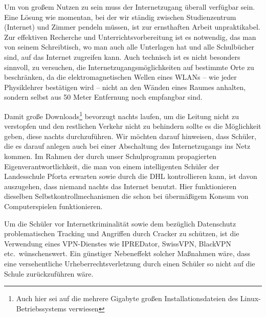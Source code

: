 \documentclass[10pt,a4paper,notitlepage]{scrartcl}
\newcommand{\gfu}{\glqq}
\begin{document}
\begin{multicols}{2}
Um von großem Nutzen zu sein muss der Internetzugang überall verfügbar sein. Eine Lösung wie momentan, bei der wir ständig zwischen Studienzentrum (\gfu Internet\grqq) und Zimmer pendeln müssen, ist zur ernsthaften Arbeit unpraktikabel. Zur effektiven Recherche und Unterrichtsvorbereitung ist es notwendig, das man von seinem Schreibtisch, wo man auch alle Unterlagen hat und alle Schulbücher sind, auf das Internet zugreifen kann. Auch technisch ist es nicht besonders sinnvoll, zu versuchen, die Internetzugangsmöglichkeiten auf bestimmte Orte zu beschränken, da die elektromagnetischen Wellen eines WLANs -- wie jeder Physiklehrer bestätigen wird -- nicht an den Wänden eines Raumes \gfu anhalten\grqq, sondern selbst aus 50 Meter Entfernung noch empfangbar sind.

Damit große Downloads\footnote{Auch hier sei auf die mehrere Gigabyte großen Installationsdateien des Linux-Betriebssystems verwiesen} bevorzugt nachts laufen, um die Leitung nicht zu verstopfen und den restlichen Verkehr nicht zu behindern sollte es die Möglichkeit geben, diese nachts durchzuführen. Wir möchten darauf hinweisen, dass Schüler, die es darauf anlegen auch bei einer Abschaltung des Internetzugangs ins Netz kommen. Im Rahmen der durch unser Schulprogramm propagierten Eigenverantwortlichkeit, die man von einem intelligenten Schüler der Landesschule Pforta erwarten sowie durch die DHL kontrollieren kann, ist davon auszugehen, dass niemand nachts das Internet benutzt. Hier funktionieren dieselben Selbstkontrollmechanismen die schon bei übermäßigem Konsum von Computerspielen funktionieren.

Um die Schüler vor Internetkriminalität sowie dem bezüglich Datenschutz problematischen Tracking und Angriffen durch Cracker zu schützen, ist die Verwendung eines VPN-Dienstes wie IPREDator, SwissVPN, BlackVPN etc.\ wünschenswert. Ein günstiger Nebeneffekt solcher Maßnahmen wäre, dass eine versehentliche Urheberrechtsverletzung durch einen Schüler so nicht auf die Schule zurückzuführen wäre.
\end{multicols}




%
\end{document}
